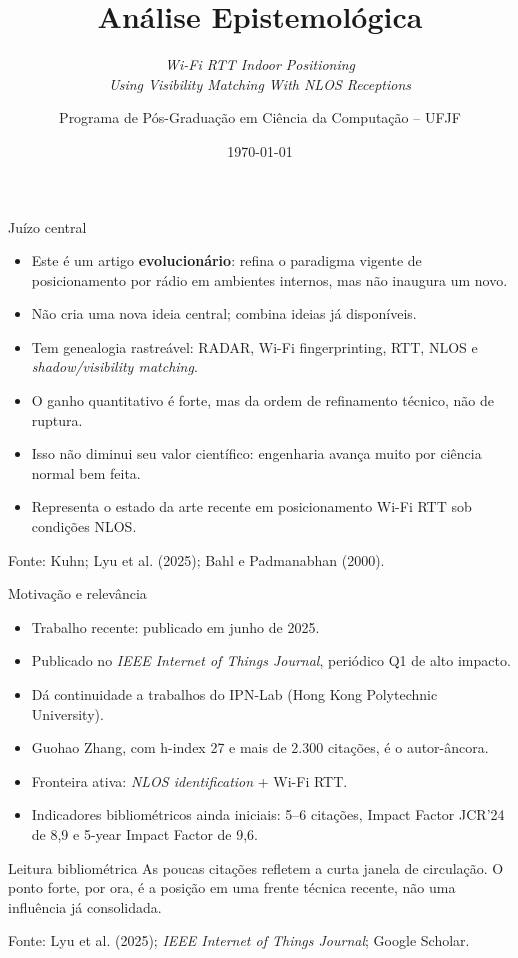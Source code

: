 \documentclass[aspectratio=169,11pt]{beamer}
\title{Análise Epistemológica}
\subtitle{\textit{Wi-Fi RTT Indoor Positioning}\\\textit{Using Visibility Matching With NLOS Receptions}}
\author{Programa de Pós-Graduação em Ciência da Computação -- UFJF}
\institute{Disciplina: Metodologia Científica -- Prof. Marcelo Bernardes Vieira}
\date{\today}
\newcommand{\slidecite}[1]{%
  \vfill
  {\color{mutedText}\footnotesize\raggedright Fonte: #1\par}
}
\begin{document}
\begin{frame}[plain]
  \titlepage
\end{frame}

\begin{frame}{Juízo central}
  \footnotesize
  \begin{itemize}
    \item Este é um artigo \textbf{evolucionário}: refina o paradigma vigente de posicionamento por rádio em ambientes internos, mas não inaugura um novo.
    \item Não cria uma nova ideia central; combina ideias já disponíveis.
    \item Tem genealogia rastreável: RADAR, Wi-Fi fingerprinting, RTT, NLOS e \textit{shadow/visibility matching}.
    \item O ganho quantitativo é forte, mas da ordem de refinamento técnico, não de ruptura.
    \item Isso não diminui seu valor científico: engenharia avança muito por ciência normal bem feita.
    \item Representa o estado da arte recente em posicionamento Wi-Fi RTT sob condições NLOS.
  \end{itemize}

  \slidecite{Kuhn; Lyu et al. (2025); Bahl e Padmanabhan (2000).}
\end{frame}

\begin{frame}{Motivação e relevância}
  \footnotesize
  \begin{itemize}
    \item Trabalho recente: publicado em junho de 2025.
    \item Publicado no \textit{IEEE Internet of Things Journal}, periódico Q1 de alto impacto.
    \item Dá continuidade a trabalhos do IPN-Lab (Hong Kong Polytechnic University).
    \item Guohao Zhang, com h-index 27 e mais de 2.300 citações, é o autor-âncora.
    \item Fronteira ativa: \textit{NLOS identification} + Wi-Fi RTT.
    \item Indicadores bibliométricos ainda iniciais: 5--6 citações, Impact Factor JCR'24 de 8,9 e 5-year Impact Factor de 9,6.
  \end{itemize}

  \vspace{0.18cm}
  \begin{block}{Leitura bibliométrica}
    As poucas citações refletem a curta janela de circulação. O ponto forte, por ora, é a posição em uma frente técnica recente, não uma influência já consolidada.
  \end{block}

  \slidecite{Lyu et al. (2025); \textit{IEEE Internet of Things Journal}; Google Scholar.}
\end{frame}
\end{document}
